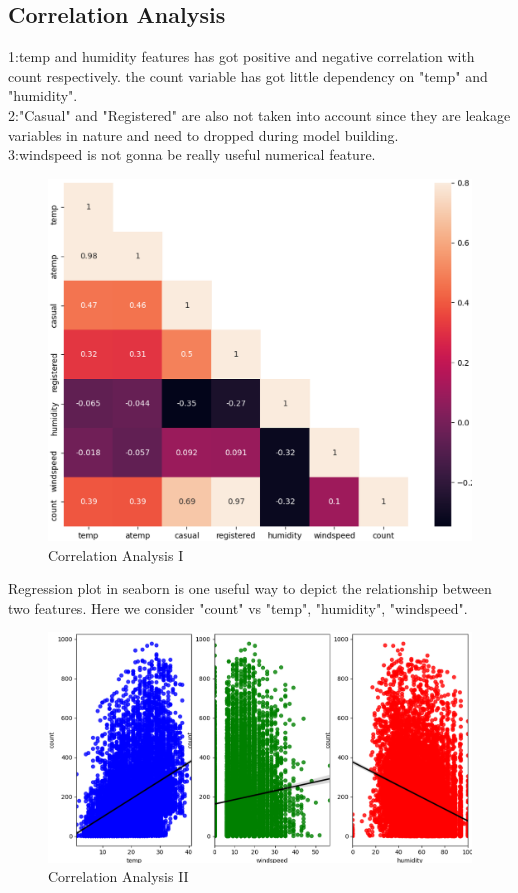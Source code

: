 \subsection{Correlation Analysis}
1:temp and humidity features has got positive and negative correlation with count respectively. the count variable has got little dependency on "temp" and "humidity". \\
2:"Casual" and "Registered" are also not taken into account since they are leakage variables in nature and need to dropped during model building. \\
3:windspeed is not gonna be really useful numerical feature.
\begin{figure}[htbp]
	\includegraphics[scale=0.5]{./figure/Figure_3.eps}
	\caption{Correlation Analysis I}
\end{figure}

Regression plot in seaborn is one useful way to depict the relationship between two features. Here we consider "count" vs "temp", "humidity", "windspeed".
\begin{figure}[htbp]
	\includegraphics[scale=0.5]{./figure/Figure_4.eps}
	\caption{Correlation Analysis II}
\end{figure}

